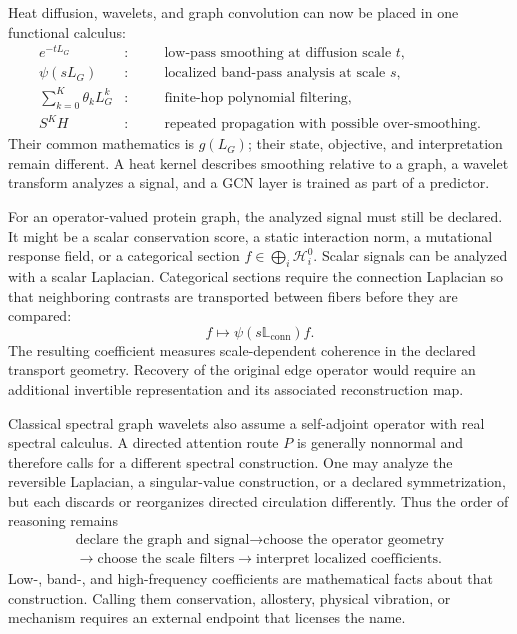 Heat diffusion, wavelets, and graph convolution can now be placed in one functional calculus:
\begin{equation}
\begin{aligned}
e^{-tL_G}&:&\quad&\text{low-pass smoothing at diffusion scale }t,\\
\psi(sL_G)&:&\quad&\text{localized band-pass analysis at scale }s,\\
\sum_{k=0}^{K}\theta_kL_G^k&:&\quad&\text{finite-hop polynomial filtering},\\
S^KH&:&\quad&\text{repeated propagation with possible over-smoothing}.
\end{aligned}
\label{eq:spectral-operator-family}
\end{equation}
Their common mathematics is $g(L_G)$; their state, objective, and interpretation remain different.
A heat kernel describes smoothing relative to a graph, a wavelet transform analyzes a signal, and a
GCN layer is trained as part of a predictor.

For an operator-valued protein graph, the analyzed signal must still be declared.  It might be a
scalar conservation score, a static interaction norm, a mutational response field, or a categorical
section $f\in\bigoplus_i\mathcal H_i^0$.  Scalar signals can be analyzed with a scalar Laplacian.
Categorical sections require the connection Laplacian so that neighboring contrasts are transported
between fibers before they are compared:
\begin{equation}
f\longmapsto\psi(s\mathbb L_{\mathrm{conn}})f.
\label{eq:connection-wavelet}
\end{equation}
The resulting coefficient measures scale-dependent coherence in the declared transport geometry.
Recovery of the original edge operator would require an additional invertible representation and
its associated reconstruction map.

Classical spectral graph wavelets also assume a self-adjoint operator with real spectral calculus.
A directed attention route $P$ is generally nonnormal and therefore calls for a different spectral
construction.  One may analyze the reversible
Laplacian, a singular-value construction, or a declared symmetrization, but each discards or
reorganizes directed circulation differently.  Thus the order of reasoning remains
\begin{equation}
\boxed{
\begin{gathered}
\text{declare the graph and signal}
\longrightarrow
\text{choose the operator geometry}\\
\longrightarrow
\text{choose the scale filters}
\longrightarrow
\text{interpret localized coefficients}.
\end{gathered}}
\label{eq:wavelet-audit-order}
\end{equation}
Low-, band-, and high-frequency coefficients are mathematical facts about that construction.
Calling them conservation, allostery, physical vibration, or mechanism requires an external
endpoint that licenses the name.
